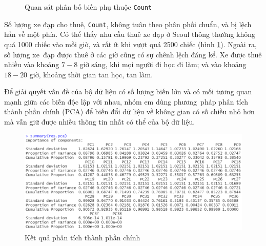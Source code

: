 \begin{figure}[H]
	\centering
		\hfill
	\caption{Quan sát phân bố biến phụ thuộc \texttt{Count}}
	\label{A2_visual3}
\end{figure}

Số lượng xe đạp cho thuê, \texttt{Count}, không tuân theo phân phối chuẩn, và bị lệch hẳn về một phía. Có thể thấy nhu cầu thuê xe đạp ở Seoul thông thường không quá 1000 chiếc vào mỗi giờ, và rất ít khi vượt quá 2500 chiếc (hình \ref{A2_visual3}). Ngoài ra, số lượng xe~đạp được thuê ở các giờ cũng có sự chênh lệch đáng kể. Xe được thuê nhiều vào khoảng $7-8$ giờ sáng, khi mọi người đi học đi làm; và vào khoảng $18-20$ giờ, khoảng thời gian tan học, tan làm.

\bigskip
Để giải quyết vấn đề của bộ dữ liệu có số lượng biến lớn và có mối tương quan mạnh giữa các biến độc lập với nhau, nhóm em dùng phương~pháp phân tích thành phần chính (PCA) để biến đổi dữ liệu về không gian có số chiều nhỏ hơn mà vẫn giữ được nhiều thông tin nhất có thể của bộ dữ liệu.

\begin{figure}[H]
	\centering
	\includegraphics[width=0.8\linewidth]{../Photo Of Result/A2_PCproportion.PNG}
	\caption{Kết quả phân tích thành phần chính }
	\label{A2_Var}
\end{figure}

